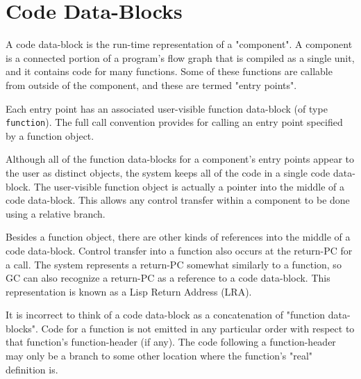 
\section{Code Data-Blocks}

A code data-block is the run-time representation of a "component".  A component
is a connected portion of a program's flow graph that is compiled as a single
unit, and it contains code for many functions.  Some of these functions are
callable from outside of the component, and these are termed "entry points".

Each entry point has an associated user-visible function data-block (of type
{\tt function}).  The full call convention provides for calling an entry point
specified by a function object.

Although all of the function data-blocks for a component's entry points appear
to the user as distinct objects, the system keeps all of the code in a single
code data-block.  The user-visible function object is actually a pointer into
the middle of a code data-block.  This allows any control transfer within a
component to be done using a relative branch.

Besides a function object, there are other kinds of references into the middle
of a code data-block.  Control transfer into a function also occurs at the
return-PC for a call.  The system represents a return-PC somewhat similarly to
a function, so GC can also recognize a return-PC as a reference to a code
data-block.  This representation is known as a Lisp Return Address (LRA).

It is incorrect to think of a code data-block as a concatenation of "function
data-blocks".  Code for a function is not emitted in any particular order with
respect to that function's function-header (if any).  The code following a
function-header may only be a branch to some other location where the
function's "real" definition is.


